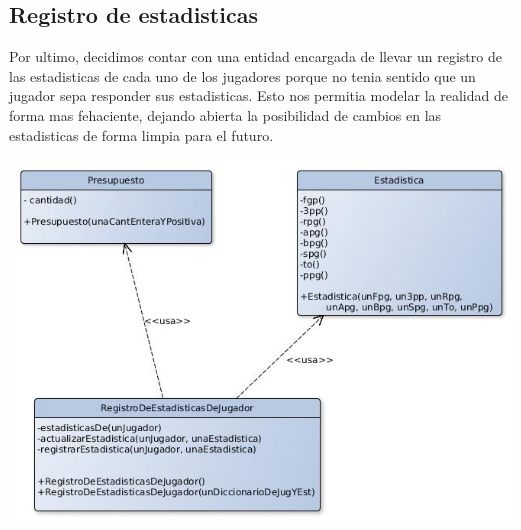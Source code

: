 \subsection{Registro de estadisticas}
Por ultimo, decidimos contar con una entidad encargada de llevar un registro de las estadisticas de cada uno de los jugadores porque no tenia sentido que un jugador sepa responder sus estadisticas. Esto nos permitia modelar la realidad de forma mas fehaciente, dejando abierta la posibilidad de cambios en las estadisticas de forma limpia para el futuro.
\begin{center}
\includegraphics[scale=0.4]{diseno/registroDeEstadisticas.jpg}
\end{center}

